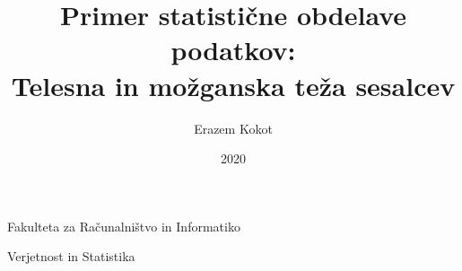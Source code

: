 \documentclass[12pt,a4paper]{article}
\title{Primer statistične obdelave podatkov:\\ Telesna in možganska teža sesalcev}
\author{Erazem Kokot}
\date{2020}
\begin{document}
    \begin{titlepage}
        \maketitle

        \vfill
        \begin{center}
            Fakulteta za Računalništvo in Informatiko

            Verjetnost in Statistika
        \end{center}
        \thispagestyle{empty}
    \end{titlepage}
    

    \tableofcontents

    \renewcommand{\listtablename}{Kazalo tabel}
    \listoftables

    \renewcommand{\listfigurename}{Kazalo grafov}
    \listoffigures
    \thispagestyle{empty}

    \newpage

    
    \newpage
    
    \newpage
    
    \newpage
    
    \newpage
    
    \newpage
    
    \newpage
    
    \newpage
    
    \newpage
    
\end{document}
